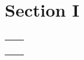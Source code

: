 \documentclass[a4paper,fleqn]{cas-dc}
\begin{document}

\section{Section I}\label{sec:one}
\lipsum[1-50]





\begin{table}[<options>]
\caption{}\label{tbl1}
\begin{tabular*}{\tblwidth}{@{}LL@{}}
\toprule
  &  \\ %
\midrule
 & \\
 & \\
 & \\
 & \\
\bottomrule
\end{tabular*}
\end{table}


\end{document}
